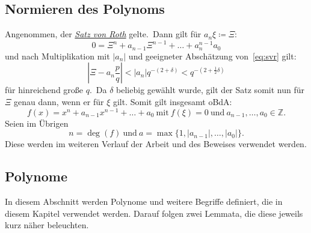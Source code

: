 \documentclass[11pt]{article}
\begin{document}
        \subsection{Normieren des Polynoms}
        \label{subsec:norm-poly}
            \textrm{Angenommen, der \hyperref[eq:svr]{\emph{Satz von Roth}} gelte.\ Dann gilt für $a_n \xi \coloneq \Xi$:}
            \begin{equation*}
                0 = \Xi^n + a_{n-1} \Xi^{n-1} + \dots + a_n^{n-1} a_0
            \end{equation*}
            \textrm{und nach Multiplikation mit $\left| a_n \right|$ und geeigneter Abschätzung von~\eqref{eq:svr} gilt:}
            \begin{equation*}
                \left| \Xi - a_n \frac{p}{q} \right| < \left| a_n \right| q^{-(2+\delta)} < q^{-(2+\frac{1}{2}\delta)}
            \end{equation*}
            \textrm{für hinreichend große $q$.\ Da $\delta$ beliebig gewählt wurde, gilt der Satz somit nun für $\Xi$
            genau dann, wenn er für $\xi$ gilt. Somit gilt insgesamt oBdA:}
            \begin{equation}
                f(x) = x^n + a_{n-1} x^{n-1} + \dots + a_0 \  \text{mit} \  f(\xi) = 0 \  \text{und} \  a_{n-1}, \dots,
                a_0 \in \mathbb{Z}. \label{eq:prereq}
            \end{equation}
            \newline
            \textrm{Seien im Übrigen}
            \begin{equation}
                n = \deg(f) \  \text{und} \  a = \max\{ 1, | a_{n-1} |, \dots, | a_0 | \}. \label{eq:def-a}
            \end{equation}
            \newline
            Diese werden im weiteren Verlauf der Arbeit und des Beweises verwendet werden.

        \subsection{Polynome}
        \label{subsec:polynomials}
            \textrm{In diesem Abschnitt werden Polynome und weitere Begriffe definiert, die in diesem Kapitel verwendet werden.
            Darauf folgen zwei Lemmata, die diese jeweils kurz näher beleuchten.}
        
\end{document}

